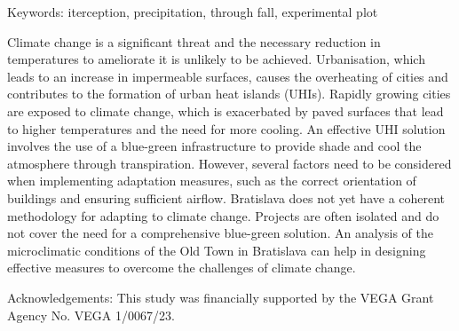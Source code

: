 Keywords: iterception, precipitation, through fall, experimental plot
\newpage{}
{}
\begin{flushleft}





\end{flushleft}

\noindent

Climate change is a significant threat and the necessary reduction in temperatures to ameliorate it is unlikely to be achieved. Urbanisation, which leads to an increase in impermeable surfaces, causes the overheating of cities and contributes to the formation of urban heat islands (UHIs). Rapidly growing cities are exposed to climate change, which is exacerbated by paved surfaces that lead to higher temperatures and the need for more cooling. An effective UHI solution involves the use of a blue-green infrastructure to provide shade and cool the atmosphere through transpiration. However, several factors need to be considered when implementing adaptation measures, such as the correct orientation of buildings and ensuring sufficient airflow. Bratislava does not yet have a coherent methodology for adapting to climate change. Projects are often isolated and do not cover the need for a comprehensive blue-green solution. An analysis of the microclimatic conditions of the Old Town in Bratislava can help in designing effective measures to overcome the challenges of climate change.

Acknowledgements: This study was financially supported by the VEGA Grant Agency No. VEGA 1/0067/23.

